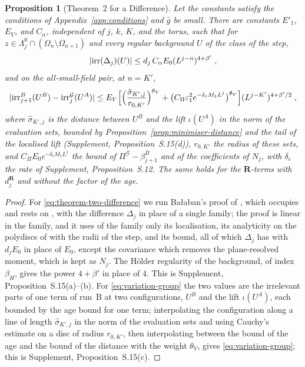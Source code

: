 \documentclass[11pt]{preprint}
\DeclarePairedDelimiter{\abs}{\lvert}{\rvert}
\numberwithin{equation}{section}
\newtheorem{proposition}[theorem]{Proposition}
\theoremstyle{definition}
\theoremstyle{remark}
\theoremstyle{plain}
\begin{document}
\begin{proposition}[Theorem~2 for a Difference]\label{prop:theorem-two-difference}
Let the constants satisfy the conditions of Appendix~\ref{app:conditions} and $\bar g$ be small. There are constants $E'_1$, $E_V$, and $C_\alpha$, independent of $j$, $k$, $K$, and the torus, such that for $z \in \Lambda^0_j \cap (\Omega_n \setminus \Omega_{n+1})$ and every regular background $U$ of the class of the step,
\begin{equation}\label{eq:theorem-two-difference}
    \abs{\mathrm{irr}(\Delta_j)(U)} \leq d_j\,C_\alpha E_0(L^{j-n})^{4+\beta'}\;,
\end{equation}
and on the all-small-field pair, at $n = K'$,
\begin{equation}\label{eq:variation-group}
    \abs{\mathrm{irr}^B_{j+1}(U^B) - \mathrm{irr}^{\mathcal G}_j(U^A)} \leq E_V\Bigl[\Bigl(\frac{\hat\sigma_{K',j}}{r_{0,K'}}\Bigr)^{\theta_V} + \bigl(C_\Pi\varepsilon_1^2e^{-\delta_cM_1L^j}\bigr)^{\theta_V}\Bigr](L^{j-K'})^{4+\beta'/2}\;,
\end{equation}
where $\hat\sigma_{K',j}$ is the distance between $U^B$ and the lift $\iota(U^A)$ in the norm of the evaluation sets, bounded by Proposition~\ref{prop:minimiser-distance} and the tail of the localised lift (Supplement, Proposition~S.15(d)), $r_{0,K'}$ the radius of these sets, and $C_\Pi E_0e^{-\delta_cM_1L^j}$ the bound of $\Pi^{\mathcal G} - \beta^B_{j+1}$ and of the coefficients of $N_j$, with $\delta_c$ the rate of Supplement, Proposition~S.12. The same holds for the $\mathbf R$-terms with $d^{\mathbf R}_j$ and without the factor of the age.
\end{proposition}

\begin{proof}
For \eqref{eq:theorem-two-difference} we run Ba{\l}aban's proof of \cite[Theorem~2, (2.43)]{BalabanCRE}, which occupies \cite[pp.~279--283]{BalabanCRE} and rests on \cite[Sects.~3--4]{BalabanRG1}, with the difference $\Delta_j$ in place of a single family; the proof is linear in the family, and it uses of the family only its localisation, its analyticity on the polydiscs of \cite[(3.13)--(3.14)]{BalabanRG1} with the radii of the step, and its bound, all of which $\Delta_j$ has with $d_jE_0$ in place of $E_0$, except the covariance which removes the plane-resolved moment, which is kept as $N_j$. The H\"older regularity of the background, of index $\beta_H$, gives the power $4 + \beta'$ in place of $4$. This is Supplement, Proposition~S.15(a)--(b). For \eqref{eq:variation-group} the two values are the irrelevant parts of one term of run~B at two configurations, $U^B$ and the lift $\iota(U^A)$, each bounded by the age bound for one term; interpolating the configuration along a line of length $\hat\sigma_{K',j}$ in the norm of the evaluation sets and using Cauchy's estimate on a disc of radius $r_{0,K'}$, then interpolating between the bound of the age and the bound of the distance with the weight $\theta_V$, gives \eqref{eq:variation-group}; this is Supplement, Proposition~S.15(c).
\end{proof}
\end{document}
